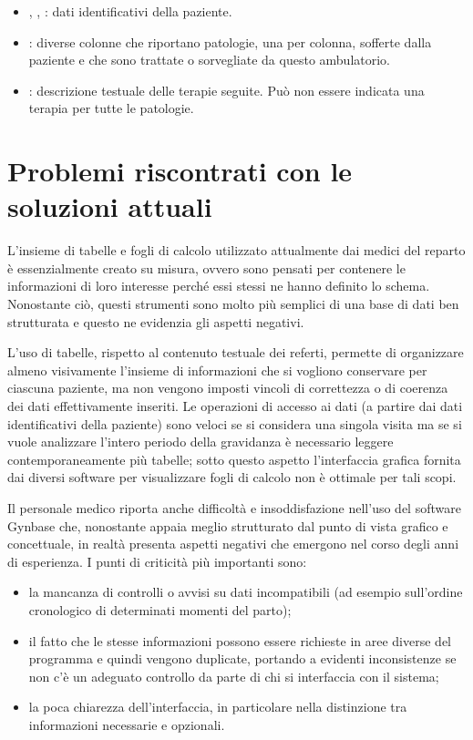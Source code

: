 \begin{itemize}
\item {}, , : dati identificativi della paziente.
\item {}: diverse colonne che riportano patologie, una per colonna, sofferte dalla paziente e che sono trattate o sorvegliate da questo ambulatorio.
\item {}: descrizione testuale delle terapie seguite. Può non essere indicata una terapia per tutte le patologie.
\end{itemize}

\section{Problemi riscontrati con le soluzioni attuali}

L'insieme di tabelle e fogli di calcolo utilizzato attualmente dai medici del reparto è essenzialmente creato su misura, ovvero sono pensati per contenere le informazioni di loro interesse perché essi stessi ne hanno definito lo schema.
Nonostante ciò, questi strumenti sono molto più semplici di una base di dati ben strutturata e questo ne evidenzia gli aspetti negativi.

L'uso di tabelle, rispetto al contenuto testuale dei referti, permette di organizzare almeno visivamente l'insieme di informazioni che si vogliono conservare per ciascuna paziente, ma non vengono imposti vincoli di correttezza o di coerenza dei dati effettivamente inseriti.
Le operazioni di accesso ai dati (a partire dai dati identificativi della paziente) sono veloci se si considera una singola visita ma se si vuole analizzare l'intero periodo della gravidanza è necessario leggere contemporaneamente più tabelle; sotto questo aspetto l'interfaccia grafica fornita dai diversi software per visualizzare fogli di calcolo non è ottimale per tali scopi.

Il personale medico riporta anche difficoltà e insoddisfazione nell'uso del software Gynbase che, nonostante appaia meglio strutturato dal punto di vista grafico e concettuale, in realtà presenta aspetti negativi che emergono nel corso degli anni di esperienza.
I punti di criticità più importanti sono:
\begin{itemize}
    \item la mancanza di controlli o avvisi su dati incompatibili (ad esempio sull'ordine cronologico di determinati momenti del parto);
    \item il fatto che le stesse informazioni possono essere richieste in aree diverse del programma e quindi vengono duplicate, portando a evidenti inconsistenze se non c'è un adeguato controllo da parte di chi si interfaccia con il sistema;
    \item la poca chiarezza dell'interfaccia, in particolare nella distinzione tra informazioni necessarie e opzionali.
\end{itemize}

